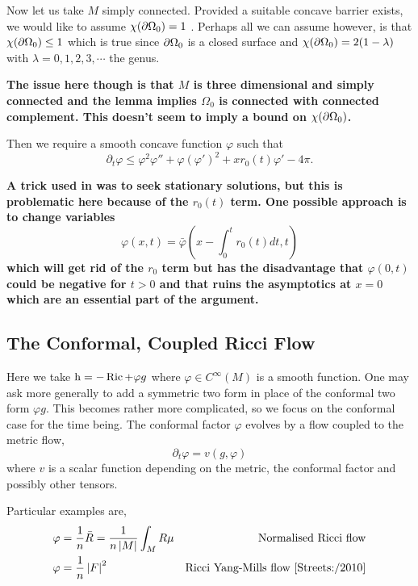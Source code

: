 \documentclass{amsart}
\begin{document}
Now let us take \(M\) simply connected. Provided a suitable concave barrier exists, we would like to assume \(\chi(\partial {\Omega_0}) = 1\) \cite[Lemma 2.9 and Corollaries]{Bryan:/2016}. Perhaps all we can assume however, is that \(\chi(\partial {\Omega_0}) \leq 1\) which is true since \(\partial {\Omega_0}\) is a closed surface and \(\chi(\partial {\Omega_0}) = 2(1-\lambda)\) with \(\lambda = 0, 1, 2, 3, \cdots\) the genus.

\textbf{The issue here though is that \(M\) is three dimensional and simply connected and the lemma implies \(\Omega_0\) is connected with connected complement. This doesn't seem to imply a bound on \(\chi(\partial {\Omega_0})\).}

Then we require a smooth concave function \(\varphi\) such that
\[
\partial_t \varphi \leq \varphi^2\varphi'' + \varphi(\varphi')^2 + x r_0(t) \varphi' - 4\pi.
\]

\textbf{A trick used in \cite{Bryan:/2016} was to seek stationary solutions, but this is problematic here because of the \(r_0(t)\) term. One possible approach is to change variables
\[
\varphi(x, t) = \bar{\varphi}(x - \int_0^t r_0(t) dt, t)
\]
which will get rid of the \(r_0\) term but has the disadvantage that \(\varphi(0, t)\) could be negative for \(t > 0\) and that ruins the asymptotics at \(x = 0\) which are an essential part of the argument.}

\subsection{The Conformal, Coupled Ricci Flow }
\label{subsec:flows_ricci_coupled}

Here we take \(\operatorname{h} = -\operatorname{Ric} + \varphi g\) where \(\varphi \in C^{\infty}(M)\) is a smooth function. One may ask more generally to add a symmetric two form in place of the conformal two form \(\varphi g\). This becomes rather more complicated, so we focus on the conformal case for the time being. The conformal factor \(\varphi\) evolves by a flow coupled to the metric flow,
\[
\partial_t \varphi = v(g, \varphi)
\]
where \(v\) is a scalar function depending on the metric, the conformal factor and possibly other tensors.

Particular examples are,
\begin{align*}
\varphi &= \frac{1}{n} \bar{R} = \frac{1}{n\left|{M}\right|} \int_M R \mu & \text{Normalised Ricci flow} \\
\varphi &= \frac{1}{n} \left|{F}\right|^2 & \text{Ricci Yang-Mills flow \cite{Streets:/2010}}
\end{align*}
\end{document}
